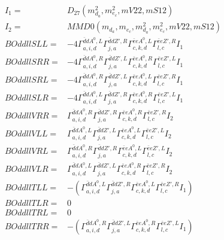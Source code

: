 \documentclass[A4,landscape]{article}
\begin{document}
\begin{align} 
I_1 = & D_{27}(m^2_{d_{{a}}}, m^2_{e_{{c}}}, mV22, mS12) \\ 
I_2 = & MMD0(m_{d_{{a}}}, m_{e_{{c}}}, m^2_{d_{{a}}}, m^2_{e_{{c}}}, mV22, mS12) \\ 
  BOddllSLL= & -4  \Gamma^{\bar{d}d A^0 ,L}_{a, i, d} \Gamma^{\bar{d}d {Z'} ,R}_{j, a} \Gamma^{\bar{e}e A^0 ,L}_{c, k, d} \Gamma^{\bar{e}e {Z'} ,R}_{l, c} I_1 \\ 
  BOddllSRR= & -4  \Gamma^{\bar{d}d A^0 ,R}_{a, i, d} \Gamma^{\bar{d}d {Z'} ,L}_{j, a} \Gamma^{\bar{e}e A^0 ,R}_{c, k, d} \Gamma^{\bar{e}e {Z'} ,L}_{l, c} I_1 \\ 
  BOddllSRL= & -4  \Gamma^{\bar{d}d A^0 ,R}_{a, i, d} \Gamma^{\bar{d}d {Z'} ,L}_{j, a} \Gamma^{\bar{e}e A^0 ,L}_{c, k, d} \Gamma^{\bar{e}e {Z'} ,R}_{l, c} I_1 \\ 
  BOddllSLR= & -4  \Gamma^{\bar{d}d A^0 ,L}_{a, i, d} \Gamma^{\bar{d}d {Z'} ,R}_{j, a} \Gamma^{\bar{e}e A^0 ,R}_{c, k, d} \Gamma^{\bar{e}e {Z'} ,L}_{l, c} I_1 \\ 
  BOddllVRR= &  \Gamma^{\bar{d}d A^0 ,R}_{a, i, d} \Gamma^{\bar{d}d {Z'} ,R}_{j, a} \Gamma^{\bar{e}e A^0 ,R}_{c, k, d} \Gamma^{\bar{e}e {Z'} ,R}_{l, c} I_2 \\ 
  BOddllVLL= &  \Gamma^{\bar{d}d A^0 ,L}_{a, i, d} \Gamma^{\bar{d}d {Z'} ,L}_{j, a} \Gamma^{\bar{e}e A^0 ,L}_{c, k, d} \Gamma^{\bar{e}e {Z'} ,L}_{l, c} I_2 \\ 
  BOddllVRL= &  \Gamma^{\bar{d}d A^0 ,R}_{a, i, d} \Gamma^{\bar{d}d {Z'} ,R}_{j, a} \Gamma^{\bar{e}e A^0 ,L}_{c, k, d} \Gamma^{\bar{e}e {Z'} ,L}_{l, c} I_2 \\ 
  BOddllVLR= &  \Gamma^{\bar{d}d A^0 ,L}_{a, i, d} \Gamma^{\bar{d}d {Z'} ,L}_{j, a} \Gamma^{\bar{e}e A^0 ,R}_{c, k, d} \Gamma^{\bar{e}e {Z'} ,R}_{l, c} I_2 \\ 
  BOddllTLL= & -( \Gamma^{\bar{d}d A^0 ,L}_{a, i, d} \Gamma^{\bar{d}d {Z'} ,R}_{j, a} \Gamma^{\bar{e}e A^0 ,L}_{c, k, d} \Gamma^{\bar{e}e {Z'} ,R}_{l, c} I_1) \\ 
  BOddllTLR= & 0 \\ 
  BOddllTRL= & 0 \\ 
  BOddllTRR= & -( \Gamma^{\bar{d}d A^0 ,R}_{a, i, d} \Gamma^{\bar{d}d {Z'} ,L}_{j, a} \Gamma^{\bar{e}e A^0 ,R}_{c, k, d} \Gamma^{\bar{e}e {Z'} ,L}_{l, c} I_1) \\ 
\end{align} 
\end{document}
